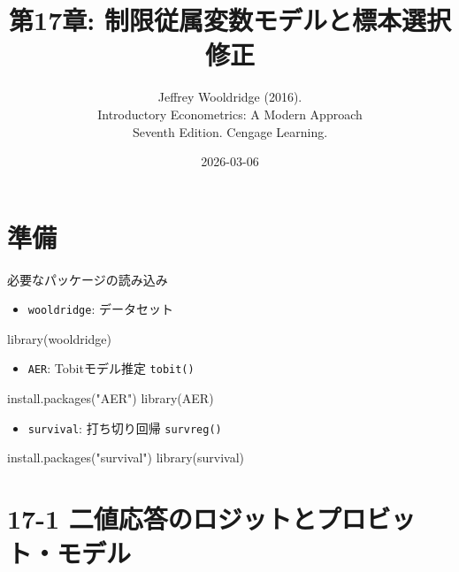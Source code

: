 \documentclass[
  ignorenonframetext,
]{beamer}
\title{第17章: 制限従属変数モデルと標本選択修正}
\subtitle{Jeffrey Wooldridge (2016).\\
Introductory Econometrics: A Modern Approach\\
Seventh Edition. Cengage Learning.}
\author{}
\date{\vspace{-2.5em}2026-03-06}
\newenvironment{Shaded}{\begin{snugshade}}{\end{snugshade}}
\newcommand{\FunctionTok}[1]{\textcolor[rgb]{0.00,0.00,0.00}{#1}}
\newcommand{\NormalTok}[1]{#1}
\newcommand{\StringTok}[1]{\textcolor[rgb]{0.31,0.60,0.02}{#1}}
\providecommand{\tightlist}{%
  \setlength{\itemsep}{0pt}\setlength{\parskip}{0pt}}
\begin{document}
\frame{\titlepage}

\hypertarget{ux6e96ux5099}{%
\section{準備}\label{ux6e96ux5099}}

\begin{frame}[fragile]{必要なパッケージの読み込み}
\protect\hypertarget{ux5fc5ux8981ux306aux30d1ux30c3ux30b1ux30fcux30b8ux306eux8aadux307fux8fbcux307f}{}
\begin{itemize}
\tightlist
\item
  \texttt{wooldridge}: データセット
\end{itemize}

\begin{Shaded}
\begin{Highlighting}[]
\FunctionTok{library}\NormalTok{(wooldridge)}
\end{Highlighting}
\end{Shaded}

\begin{itemize}
\tightlist
\item
  \texttt{AER}: Tobitモデル推定 \texttt{tobit()}
\end{itemize}

\begin{Shaded}
\begin{Highlighting}[]
\FunctionTok{install.packages}\NormalTok{(}\StringTok{"AER"}\NormalTok{)}
\FunctionTok{library}\NormalTok{(AER)}
\end{Highlighting}
\end{Shaded}

\begin{itemize}
\tightlist
\item
  \texttt{survival}: 打ち切り回帰 \texttt{survreg()}
\end{itemize}

\begin{Shaded}
\begin{Highlighting}[]
\FunctionTok{install.packages}\NormalTok{(}\StringTok{"survival"}\NormalTok{)}
\FunctionTok{library}\NormalTok{(survival)}
\end{Highlighting}
\end{Shaded}
\end{frame}

\hypertarget{ux4e8cux5024ux5fdcux7b54ux306eux30edux30b8ux30c3ux30c8ux3068ux30d7ux30edux30d3ux30c3ux30c8ux30e2ux30c7ux30eb}{%
\section{17-1
二値応答のロジットとプロビット・モデル}\label{ux4e8cux5024ux5fdcux7b54ux306eux30edux30b8ux30c3ux30c8ux3068ux30d7ux30edux30d3ux30c3ux30c8ux30e2ux30c7ux30eb}}
\end{document}
